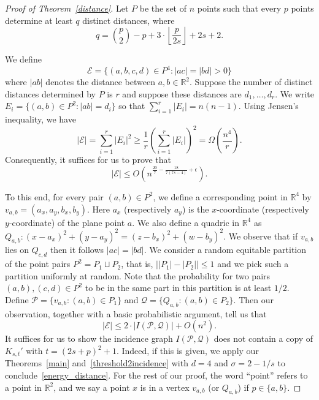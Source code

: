 \documentclass[11pt]{article}
\theoremstyle{definition}
\begin{document}
\begin{proof}[Proof of Theorem~\ref{distance}]

Let $P$ be the set of $n$ points such that every $p$ points determine at least $q$ distinct distances, where
\begin{equation*}
        q = \binom{p}{2} - p + 3 \cdot \left\lfloor \frac{p}{2s} \right\rfloor + 2s + 2.
\end{equation*}

We define \begin{equation*}
        \mathcal{E} = \{ (a,b,c,d) \in P^4: |ac| = |bd| > 0 \}
\end{equation*} where $|ab|$ denotes the distance between $a,b \in \mathbb{R}^2$. Suppose the number of distinct distances determined by $P$ is $r$ and suppose these distances are $d_1, \ldots, d_r$. We write $E_i = \{ (a,b) \in P^2 : |ab| = d_i\}$ so that $\sum_{i=1}^{r} |E_i| = n(n-1)$. Using Jensen's inequality, we have
\begin{equation*}
    |\mathcal{E}| = \sum_{i=1}^{r} |E_i|^2 \geq \frac{1}{r} \left(\sum_{i=1}^r |E_i| \right)^2  = \Omega\left(\frac{n^4}{r} \right).
\end{equation*} Consequently, it suffices for us to prove that
\begin{equation}\label{energy_distance}
    |\mathcal{E}| \leq O\left(n^{\frac{20}{7} - \frac{18}{7(7s-4)} + \epsilon} \right).
\end{equation}

To this end, for every pair $(a,b) \in P^2$, we define a corresponding point in $\mathbb{R}^4$ by $v_{a,b} = (a_x, a_y, b_x, b_y)$. Here $a_x$ (respectively $a_y$) is the $x$-coordinate (respectively $y$-coordinate) of the plane point $a$. We also define a quadric in $\mathbb{R}^4$ as $Q_{a,b} : (x -a_x)^2 + (y - a_y)^2 = (z - b_x)^2 + (w - b_y)^2$. We observe that if $v_{a,b}$ lies on $Q_{c,d}$ then it follows $|ac| = |bd|$. We consider a random equitable partition of the point pairs $P^2 = P_1 \sqcup P_2$, that is, $\left||P_1|-|P_2|\right|\leq 1$ and we pick such a partition uniformly at random. Note that the probability for two pairs $(a,b),(c,d)\in P^2$ to be in the same part in this partition is at least $1/2$. Define $\mathcal{P} = \{ v_{a,b} : (a,b) \in P_1\}$ and $\mathcal{Q} = \{ Q_{a,b}: (a,b) \in P_2\}$. Then our observation, together with a basic probabilistic argument, tell us that
\begin{equation*}
    |\mathcal{E}| \leq  2 \cdot |I(\mathcal{P}, \mathcal{Q})| + O(n^2).
\end{equation*} It suffices for us to show the incidence graph $I(\mathcal{P}, \mathcal{Q})$ does not contain a copy of $K_{s, t}'$ with $t = (2s + p)^2 + 1$. Indeed, if this is given, we apply our Theorems~\ref{main} and~\ref{threshold2incidence} with $d = 4$ and $\sigma = 2 - 1/s$ to conclude~\eqref{energy_distance}. For the rest of our proof, the word ``point'' refers to a point in $\mathbb{R}^2$, and we say a point $x$ is in a vertex $v_{a,b}$ (or $Q_{a,b}$) if $p \in \{a,b\}$.


\end{proof}
\end{document}
